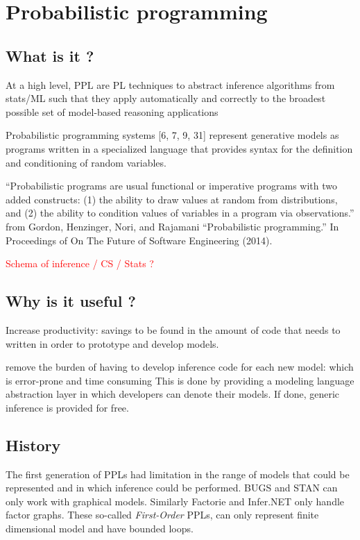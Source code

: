 \chapter{Probabilistic programming}

\section{What is it ?} \label{PPL_def}
At a high level, \gls{PPL} are \gls{PL} techniques to abstract inference algorithms from stats/ML such that they apply automatically and correctly to the broadest possible set of model-based reasoning applications

Probabilistic programming systems [6, 7, 9, 31] represent generative models as programs written in a specialized language that provides syntax for the definition and conditioning of random variables.

“Probabilistic programs are usual functional or imperative programs with two added constructs: 
(1) the ability to draw values at random from distributions, and 
(2) the ability to condition values of variables in a program via observations.”  
from  Gordon, Henzinger, Nori, and Rajamani “Probabilistic programming.” In Proceedings of On The Future of Software Engineering (2014).

\textcolor{red}{Schema of inference / CS / Stats ?}

\section{Why is it useful ?}
Increase productivity: savings to be found in the amount of code that needs to written in order to prototype and develop models.

remove the burden of having to develop inference code for each new model: which is error-prone and time consuming
This is done by providing a modeling language abstraction layer in which developers can denote their models.  If done, generic inference is provided for free.

\section{History}
The first generation of \gls{PPL}s had limitation in the range of models that could be represented and in which inference could be performed.
BUGS \cite{Bugs} and STAN \cite{Stan} can only work with graphical models.
Similarly Factorie \cite{Factorie} and Infer.NET \cite{InferNET} only handle factor graphs.
These so-called \textit{First-Order} \gls{PPLs}, can only represent finite dimensional model and have bounded loops.


